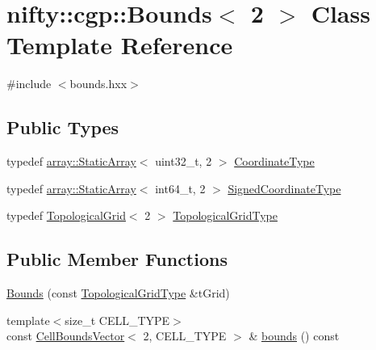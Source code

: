 \hypertarget{classnifty_1_1cgp_1_1Bounds_3_012_01_4}{}\section{nifty\+:\+:cgp\+:\+:Bounds$<$ 2 $>$ Class Template Reference}
\label{classnifty_1_1cgp_1_1Bounds_3_012_01_4}


{\ttfamily \#include $<$bounds.\+hxx$>$}

\subsection*{Public Types}
\begin{DoxyCompactItemize}
\item 
typedef \hyperlink{namespacenifty_1_1array_a683f151f19c851754e0c6d55ed16a0c2}{array\+::\+Static\+Array}$<$ uint32\+\_\+t, 2 $>$ \hyperlink{classnifty_1_1cgp_1_1Bounds_3_012_01_4_aa7c3be371d84aea05e916a30d859d7ff}{Coordinate\+Type}
\item 
typedef \hyperlink{namespacenifty_1_1array_a683f151f19c851754e0c6d55ed16a0c2}{array\+::\+Static\+Array}$<$ int64\+\_\+t, 2 $>$ \hyperlink{classnifty_1_1cgp_1_1Bounds_3_012_01_4_aa2abaddff55015fc8a158881f4e90571}{Signed\+Coordinate\+Type}
\item 
typedef \hyperlink{classnifty_1_1cgp_1_1TopologicalGrid}{Topological\+Grid}$<$ 2 $>$ \hyperlink{classnifty_1_1cgp_1_1Bounds_3_012_01_4_a97f375ade92ba9870b7a31da87626337}{Topological\+Grid\+Type}
\end{DoxyCompactItemize}
\subsection*{Public Member Functions}
\begin{DoxyCompactItemize}
\item 
\hyperlink{classnifty_1_1cgp_1_1Bounds_3_012_01_4_aadcad33a9b3fa58464bae7aae61f3f5d}{Bounds} (const \hyperlink{classnifty_1_1cgp_1_1Bounds_3_012_01_4_a97f375ade92ba9870b7a31da87626337}{Topological\+Grid\+Type} \&t\+Grid)
\item 
{\footnotesize template$<$size\+\_\+t C\+E\+L\+L\+\_\+\+T\+Y\+P\+E$>$ }\\const \hyperlink{classnifty_1_1cgp_1_1CellBoundsVector}{Cell\+Bounds\+Vector}$<$ 2, C\+E\+L\+L\+\_\+\+T\+Y\+P\+E $>$ \& \hyperlink{classnifty_1_1cgp_1_1Bounds_3_012_01_4_a543c85c3c2a0bab5202423907ebcffa1}{bounds} () const 
\end{DoxyCompactItemize}



